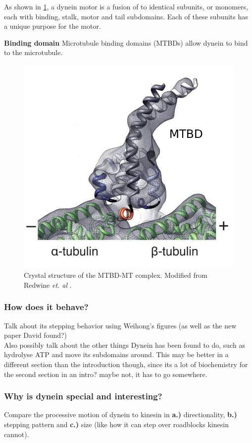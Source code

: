\documentclass[10pt]{article} %
\begin{document}
As shown in \ref{dynein-artist-rendition-2}, a dynein motor is a fusion of to identical subunits, or monomers, each with binding, stalk, motor and tail subdomains. Each of these subunits has a unique purpose for the motor.

\textbf{Binding domain}
Microtubule binding domains (MTBDs) allow dynein to bind to the microtubule. 

\begin{figure}[h]
  \centering
  \includegraphics[width=.65\textwidth,keepaspectratio]{../../figures/mtbd-complex.png}
  \caption{Crystal structure of the MTBD-MT complex. Modified from Redwine \textit{et. al} \cite{redwineMTBDcomplex}.}
  \label{dynein-artist-rendition-2}
\end{figure}

\subsubsection{How does it behave?}
Talk about its stepping behavior using Weihong's figures (as well as the new paper David found?)\\

Also possibly talk about the other things Dynein has been found to do, such as hydrolyse ATP and
move its subdomains around. This may be better in a different section than the introduction though,
since its a lot of biochemistry for the second section in an intro? maybe not, it has to go somewhere.

\subsubsection{Why is dynein special and interesting?}
Compare the processive motion of dynein to kinesin in \textbf{a.)} directionality, \textbf{b.)}
stepping pattern and \textbf{c.)} size (like how it can step over roadblocks kinesin cannot).\\
\end{document}
